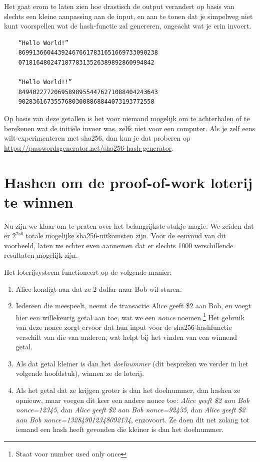 Het gaat erom te laten zien hoe drastisch de output verandert op basis van slechts een kleine aanpassing aan de input, en aan te tonen dat je simpelweg niet kunt voorspellen wat de hash-functie zal genereren, ongeacht wat je erin invoert.

\begin{verbatim}
    “Hello World!”
    869913660443924676617831651669733090238
    07181648024718778313526389892860994842
   
    “Hello World!!”
    849402277206958989554476271088404243643
    90283616735576803008868844073193772558
    \end{verbatim}

Op basis van deze getallen is het voor niemand mogelijk om te achterhalen of te berekenen wat de initiële invoer was, zelfs niet voor een computer. Als je zelf eens wilt experimenteren met sha256, dan kun je dat proberen op \href{https://passwordsgenerator.net/sha256-hash-generator}{https://passwordsgenerator.net/sha256-hash-generator}.

\section{Hashen om de proof-of-work loterij te winnen}

Nu zijn we klaar om te praten over het belangrijkste stukje magie. We zeiden dat er $2^{256}$ totale mogelijke sha256-uitkomsten zijn. Voor de eenvoud van dit voorbeeld, laten we echter even aannemen dat er slechts 1000 verschillende resultaten mogelijk zijn.

Het loterijsysteem functioneert op de volgende manier:

\begin{enumerate}
    \item Alice kondigt aan dat ze 2 dollar naar \mbox{Bob} wil sturen.
    \item Iedereen die meespeelt, neemt de transactie \textquotedbl{}Alice geeft \$2 aan Bob\textquotedbl{}, en voegt hier een willekeurig getal aan toe, wat we een \textit{nonce} noemen.\footnote{Staat voor \textquotedbl{}number used only once\textquotedbl{}} Het gebruik van deze nonce zorgt ervoor dat hun input voor de sha256-hashfunctie verschilt van die van anderen, wat helpt bij het vinden van een winnend getal.
    \item Als dat getal kleiner is dan het \textit{doelnummer} (dit bespreken we verder in het volgende hoofdstuk), winnen ze de loterij.
    \item Als het getal dat ze krijgen groter is dan het doelnummer, dan hashen ze opnieuw, maar voegen dit keer een andere nonce toe: \textit{\textquotedbl{}Alice geeft \$2 aan Bob nonce=12345\textquotedbl{}}, dan \textit{\textquotedbl{}Alice geeft \$2 aan Bob nonce=92435\textquotedbl{}}, dan \textit{\textquotedbl{}Alice geeft \$2 aan Bob nonce=132849012348092134\textquotedbl{}}, enzovoort. Ze doen dit net zolang tot iemand een hash heeft gevonden die kleiner is dan het doelnummer.
 \end{enumerate}   
 
